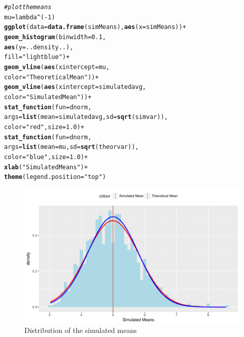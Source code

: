 \documentclass{article}\usepackage[]{graphicx}\usepackage[]{color}
\makeatletter
\def\maxwidth{ %
  \ifdim\Gin@nat@width>\linewidth
    \linewidth
  \else
    \Gin@nat@width
  \fi
}
\newcommand{\hlnum}[1]{\textcolor[rgb]{0.686,0.059,0.569}{#1}}%
\newcommand{\hlstr}[1]{\textcolor[rgb]{0.192,0.494,0.8}{#1}}%
\newcommand{\hlcom}[1]{\textcolor[rgb]{0.678,0.584,0.686}{\textit{#1}}}%
\newcommand{\hlopt}[1]{\textcolor[rgb]{0,0,0}{#1}}%
\newcommand{\hlstd}[1]{\textcolor[rgb]{0.345,0.345,0.345}{#1}}%
\newcommand{\hlkwb}[1]{\textcolor[rgb]{0.69,0.353,0.396}{#1}}%
\newcommand{\hlkwc}[1]{\textcolor[rgb]{0.333,0.667,0.333}{#1}}%
\newcommand{\hlkwd}[1]{\textcolor[rgb]{0.737,0.353,0.396}{\textbf{#1}}}%
\newenvironment{kframe}{%
 \def\at@end@of@kframe{}%
 \ifinner\ifhmode%
  \def\at@end@of@kframe{\end{minipage}}%
  \begin{minipage}{\columnwidth}%
 \fi\fi%
 \def\FrameCommand##1{\hskip\@totalleftmargin \hskip-\fboxsep
 \colorbox{shadecolor}{##1}\hskip-\fboxsep
     \hskip-\linewidth \hskip-\@totalleftmargin \hskip\columnwidth}%
 \MakeFramed {\advance\hsize-\width
   \@totalleftmargin\z@ \linewidth\hsize
   \@setminipage}}%
 {\par\unskip\endMakeFramed%
 \at@end@of@kframe}
\newenvironment{knitrout}{}{} %
\makeatother
\begin{document}
\begin{knitrout}
\color{fgcolor}\begin{kframe}
\begin{alltt}
\hlcom{# plot the means}
\hlstd{mu} \hlkwb{=} \hlstd{lambda}\hlopt{^}\hlstd{(}\hlopt{-}\hlnum{1}\hlstd{)}
\hlkwd{ggplot}\hlstd{(}\hlkwc{data} \hlstd{=} \hlkwd{data.frame}\hlstd{(simMeans),} \hlkwd{aes}\hlstd{(}\hlkwc{x} \hlstd{= simMeans))} \hlopt{+}
\hlkwd{geom_histogram}\hlstd{(}\hlkwc{binwidth}\hlstd{=}\hlnum{0.1}\hlstd{,}
               \hlkwd{aes}\hlstd{(}\hlkwc{y}\hlstd{=..density..),}
               \hlkwc{fill}\hlstd{=}\hlstr{"lightblue"}\hlstd{)} \hlopt{+}
\hlkwd{geom_vline}\hlstd{(}\hlkwd{aes}\hlstd{(}\hlkwc{xintercept}\hlstd{=mu,}
               \hlkwc{color}\hlstd{=}\hlstr{"Theoretical Mean"}\hlstd{))}\hlopt{+}
\hlkwd{geom_vline}\hlstd{(}\hlkwd{aes}\hlstd{(}\hlkwc{xintercept}\hlstd{=simulatedavg,}
               \hlkwc{color}\hlstd{=}\hlstr{"Simulated Mean"}\hlstd{))}\hlopt{+}
\hlkwd{stat_function}\hlstd{(}\hlkwc{fun} \hlstd{= dnorm,}
              \hlkwc{args} \hlstd{=} \hlkwd{list}\hlstd{(}\hlkwc{mean} \hlstd{= simulatedavg,} \hlkwc{sd} \hlstd{=} \hlkwd{sqrt}\hlstd{(simvar)),}
              \hlkwc{color} \hlstd{=} \hlstr{"red"}\hlstd{,} \hlkwc{size} \hlstd{=} \hlnum{1.0}\hlstd{)}\hlopt{+}
\hlkwd{stat_function}\hlstd{(}\hlkwc{fun} \hlstd{= dnorm,}
              \hlkwc{args} \hlstd{=} \hlkwd{list}\hlstd{(}\hlkwc{mean} \hlstd{= mu,} \hlkwc{sd} \hlstd{=} \hlkwd{sqrt}\hlstd{(theorvar)),}
              \hlkwc{color} \hlstd{=} \hlstr{"blue"}\hlstd{,} \hlkwc{size} \hlstd{=} \hlnum{1.0}\hlstd{)}\hlopt{+}
\hlkwd{xlab}\hlstd{(}\hlstr{"Simulated Means"}\hlstd{)}\hlopt{+}
\hlkwd{theme}\hlstd{(}\hlkwc{legend.position} \hlstd{=} \hlstr{"top"}\hlstd{)}
\end{alltt}
\end{kframe}\begin{figure}
\includegraphics[width=\maxwidth]{figure/density-1} \caption[Distribution of the simulated means]{Distribution of the simulated means}\label{fig:density}
\end{figure}


\end{knitrout}
\end{document}
